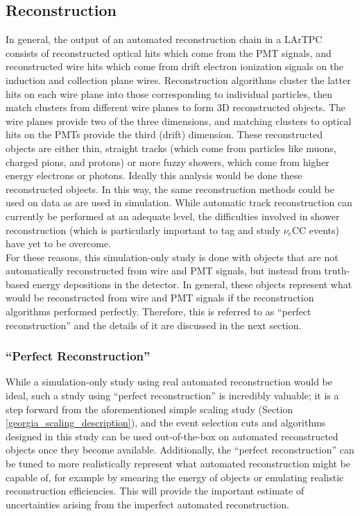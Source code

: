 \subsection{Reconstruction}
In general, the output of an automated reconstruction chain in a LArTPC consists of reconstructed optical hits which come from the PMT signals, and reconstructed wire hits which come from drift electron ionization signals on the induction and collection plane wires. Reconstruction algorithms cluster the latter hits on each wire plane into those corresponding to individual particles, then match clusters from different wire planes to form 3D reconstructed objects. The wire planes provide two of the three dimensions, and matching clusters to optical hits on the PMTs provide the third (drift) dimension. These reconstructed objects are either thin, straight tracks (which come from particles like muons, charged pions, and protons) or more fuzzy showers, which come from higher energy electrons or photons. Ideally this analysis would be done these reconstructed objects. In this way, the same reconstruction methods could be used on data as are used in simulation. While automatic track reconstruction can currently be performed at an adequate level, the difficulties involved in shower reconstruction (which is particularly important to tag and study $\nu_e$CC events) have yet to be overcome.\\

For these reasons, this simulation-only study is done with objects that are not automatically reconstructed from wire and PMT signals, but instead from truth-based energy depositions in the detector. In general, these objects represent what would be reconstructed from wire and PMT signals if the reconstruction algorithms performed perfectly. Therefore, this is referred to as ``perfect reconstruction'' and the details of it are discussed in the next section. 

\subsubsection{``Perfect Reconstruction''}\label{perfectreco_section}
While a simulation-only study using real automated reconstruction would be ideal, such a study using ``perfect reconstruction'' is incredibly valuable; it is a step forward from the aforementioned simple scaling study (Section \ref{georgia_scaling_description}), and the event selection cuts and algorithms designed in this study can be used out-of-the-box on automated reconstructed objects once they become available. Additionally, the ``perfect reconstruction'' can be tuned to more realistically represent what automated reconstruction might be capable of, for example by smearing the energy of objects or emulating realistic reconstruction efficiencies. This will provide the important estimate of uncertainties arising from the imperfect automated reconstruction.\\

